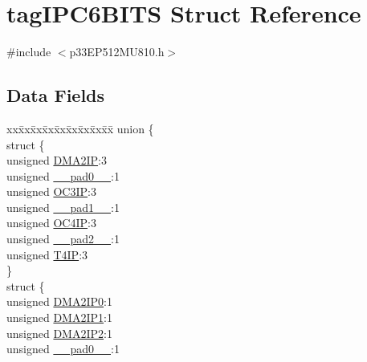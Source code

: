 \hypertarget{structtag_i_p_c6_b_i_t_s}{}\section{tag\+I\+P\+C6\+B\+I\+TS Struct Reference}
\label{structtag_i_p_c6_b_i_t_s}


{\ttfamily \#include $<$p33\+E\+P512\+M\+U810.\+h$>$}

\subsection*{Data Fields}
\begin{DoxyCompactItemize}
\item 
\begin{tabbing}
xx\=xx\=xx\=xx\=xx\=xx\=xx\=xx\=xx\=\kill
union \{\\
\>struct \{\\
\>\>unsigned \hyperlink{structtag_i_p_c6_b_i_t_s_aa1e0c4bd782aef0a825b277de16d3807}{DMA2IP}:3\\
\>\>unsigned \hyperlink{structtag_i_p_c6_b_i_t_s_adf71f3d8410c1f1dbbc96680a92c49af}{\_\_pad0\_\_}:1\\
\>\>unsigned \hyperlink{structtag_i_p_c6_b_i_t_s_afcaf59da9bb0539bad015416504186d9}{OC3IP}:3\\
\>\>unsigned \hyperlink{structtag_i_p_c6_b_i_t_s_acaf2d0924a107ec6e8d2e31febaf66f9}{\_\_pad1\_\_}:1\\
\>\>unsigned \hyperlink{structtag_i_p_c6_b_i_t_s_a34bfe9ca9885e3bc8684f41c2c2f5dd3}{OC4IP}:3\\
\>\>unsigned \hyperlink{structtag_i_p_c6_b_i_t_s_a4d97cc5f7d51d22fc2bf3eab35c9cb7f}{\_\_pad2\_\_}:1\\
\>\>unsigned \hyperlink{structtag_i_p_c6_b_i_t_s_a16c129302873eb7abbf5457332fe7322}{T4IP}:3\\
\>\} \\
\>struct \{\\
\>\>unsigned \hyperlink{structtag_i_p_c6_b_i_t_s_a70baae998e89ee90490269e7a628e6c6}{DMA2IP0}:1\\
\>\>unsigned \hyperlink{structtag_i_p_c6_b_i_t_s_a0e08611096cc7b1fb50592a79d8bac1b}{DMA2IP1}:1\\
\>\>unsigned \hyperlink{structtag_i_p_c6_b_i_t_s_ad21abd1bfc3edc714eb43fb9e30e0f65}{DMA2IP2}:1\\
\>\>unsigned \hyperlink{structtag_i_p_c6_b_i_t_s_adf71f3d8410c1f1dbbc96680a92c49af}{\_\_pad0\_\_}:1\\

\end{tabbing}
\end{DoxyCompactItemize}
